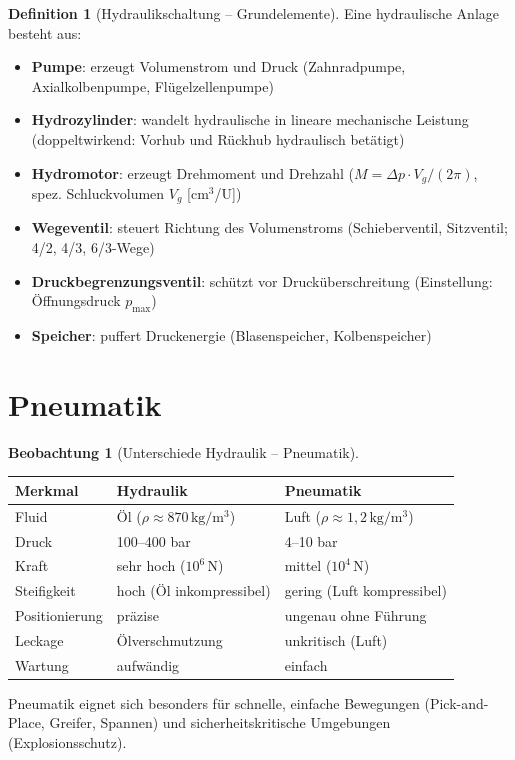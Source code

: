 ﻿\documentclass[a4paper,12pt]{report}
\theoremstyle{definition}
\newtheorem{definition}{Definition}
\newtheorem{beobachtung}{Beobachtung}
\begin{document}
\begin{definition}[Hydraulikschaltung -- Grundelemente]
Eine hydraulische Anlage besteht aus:
\begin{itemize}
    \item[-] \textbf{Pumpe}: erzeugt Volumenstrom und Druck
          (Zahnradpumpe, Axialkolbenpumpe, Flügelzellenpumpe)
    \item[-] \textbf{Hydrozylinder}: wandelt hydraulische in lineare mechanische Leistung
          (doppeltwirkend: Vorhub und Rückhub hydraulisch betätigt)
    \item[-] \textbf{Hydromotor}: erzeugt Drehmoment und Drehzahl
          ($M = \Delta p \cdot V_g / (2\pi)$, spez. Schluckvolumen $V_g$ [cm$^3$/U])
    \item[-] \textbf{Wegeventil}: steuert Richtung des Volumenstroms
          (Schieberventil, Sitzventil; 4/2, 4/3, 6/3-Wege)
    \item[-] \textbf{Druckbegrenzungsventil}: schützt vor Drucküberschreitung
          (Einstellung: Öffnungsdruck $p_{\max}$)
    \item[-] \textbf{Speicher}: puffert Druckenergie (Blasenspeicher, Kolbenspeicher)
\end{itemize}
\end{definition}

\section{Pneumatik}

\begin{beobachtung}[Unterschiede Hydraulik -- Pneumatik]
\begin{center}
\begin{tabular}{lll}
\toprule
Merkmal & Hydraulik & Pneumatik \\
\midrule
Fluid & Öl ($\rho \approx 870\,\mathrm{kg/m^3}$) & Luft ($\rho \approx 1{,}2\,\mathrm{kg/m^3}$) \\
Druck & 100--400 bar & 4--10 bar \\
Kraft & sehr hoch ($10^6\,\mathrm{N}$) & mittel ($10^4\,\mathrm{N}$) \\
Steifigkeit & hoch (Öl inkompressibel) & gering (Luft kompressibel) \\
Positionierung & präzise & ungenau ohne Führung \\
Leckage & Ölverschmutzung & unkritisch (Luft) \\
Wartung & aufwändig & einfach \\
\bottomrule
\end{tabular}
\end{center}
Pneumatik eignet sich besonders für schnelle, einfache
Bewegungen (Pick-and-Place, Greifer, Spannen) und
sicherheitskritische Umgebungen (Explosionsschutz).
\end{beobachtung}
\end{document}
